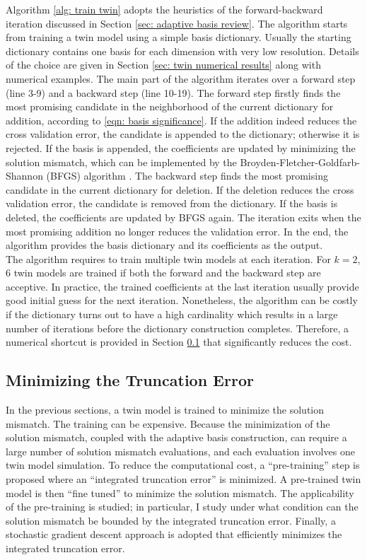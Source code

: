 Algorithm \ref{alg: train twin} adopts the heuristics of the forward-backward iteration
discussed in Section \ref{sec: adaptive basis review}.
The algorithm starts from training a twin model using 
a simple basis dictionary. Usually the starting
dictionary contains one basis for each dimension with very low resolution.
Details of the choice are given in Section 
\ref{sec: twin numerical results} along with numerical examples.
The main part of the algorithm iterates over a forward step (line 3-9) and a backward step (line
10-19). The forward step firstly finds the most promising candidate in the neighborhood of the current
dictionary for addition, according to \eqref{eqn: basis significance}.
If the addition indeed reduces the cross validation error, the candidate is appended
to the dictionary; otherwise it is rejected. 
If the basis is appended, the coefficients are updated by minimizing the solution mismatch, which can be
implemented by the Broyden-Fletcher-Goldfarb-Shannon (BFGS) algorithm \cite{quasiNewton}.
The backward step finds the most promising
candidate in the current dictionary for deletion. 
If the deletion reduces the cross validation error, the candidate
is removed from the dictionary. 
If the basis is deleted, the coefficients are updated by BFGS again.
The iteration exits when the most promising addition no longer 
reduces the validation error. In the end, the algorithm provides the basis dictionary and its
coefficients as the output.\\

The algorithm requires to train multiple twin models at each iteration. For
$k=2$, $6$ twin models are trained if both the forward and the backward step are acceptive.
In practice, the trained coefficients at the last iteration usually provide good initial guess
for the next iteration. Nonetheless, the algorithm can be costly if the dictionary turns out
to have a high cardinality which results in a large number of iterations before the dictionary 
construction completes. Therefore, a numerical shortcut is provided in Section 
\ref{sec: trunc error} that significantly reduces the cost.\\

\subsection{Minimizing the Truncation Error}
\label{sec: trunc error}
In the previous sections, a twin model is trained to minimize the solution mismatch.
The training can be expensive. Because the minimization
of the solution mismatch, coupled with the adaptive basis construction, can require
a large number of solution mismatch evaluations, and each evaluation involves one
twin model simulation. To reduce the computational cost, a ``pre-training'' step is proposed
where an ``integrated truncation error'' is minimized. 
A pre-trained twin model is then ``fine tuned'' to minimize the solution mismatch.
The applicability of the pre-training is studied; in particular, I study
under what condition can the solution mismatch be bounded by the integrated truncation error.
Finally, a stochastic gradient descent approach is adopted that efficiently 
minimizes the integrated truncation error.\\


